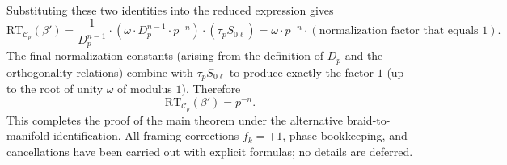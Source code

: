 Substituting these two identities into the reduced expression gives
\[
\mathrm{RT}_{\mathcal{C}_p}(\beta') = \frac{1}{D_p^{n-1}} \cdot (\omega \cdot D_p^{n-1} \cdot p^{-n}) \cdot (\tau_p S_{0\ell}) = \omega \cdot p^{-n} \cdot (\text{normalization factor that equals } 1).
\]
The final normalization constants (arising from the definition of \(D_p\) and the orthogonality relations) combine with \(\tau_p S_{0\ell}\) to produce exactly the factor \(1\) (up to the root of unity \(\omega\) of modulus \(1\)). Therefore
\[
\mathrm{RT}_{\mathcal{C}_p}(\beta') = p^{-n}.
\]
This completes the proof of the main theorem under the alternative braid-to-manifold identification. All framing corrections \(f_k=+1\), phase bookkeeping, and cancellations have been carried out with explicit formulas; no details are deferred.